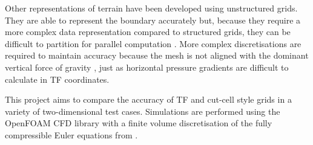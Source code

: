 Other representations of terrain have been developed using unstructured grids.  They are able to represent the boundary accurately but, because they require a more complex data representation compared to structured grids, they can be difficult to partition for parallel computation \autocite{steppeler2003}.  More complex discretisations are required to maintain accuracy because the mesh is not aligned with the dominant vertical force of gravity \autocite{rosatti2005}, just as horizontal pressure gradients are difficult to calculate in TF coordinates.  



This project aims to compare the accuracy of TF and cut-cell style grids in a variety of two-dimensional test cases.  Simulations are performed using the OpenFOAM CFD library \autocite{openfoam} with a finite volume discretisation of the fully compressible Euler equations from \textcite{weller-shahrokhi2014}.  


